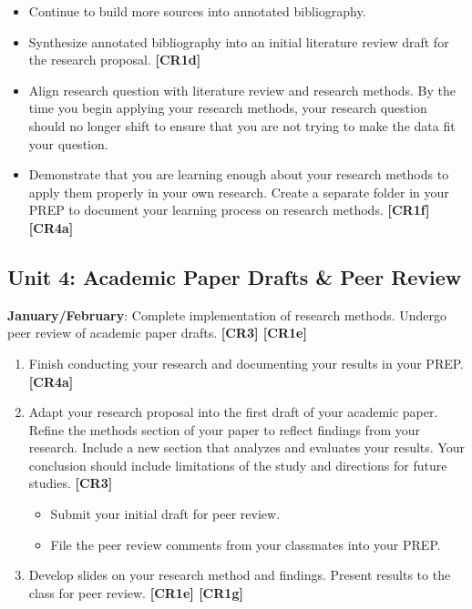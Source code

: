 \documentclass[11pt,]{article}
\providecommand{\tightlist}{%
  \setlength{\itemsep}{0pt}\setlength{\parskip}{0pt}}
\begin{document}
\begin{enumerate}
  \begin{itemize}
  \tightlist
  \item
    Continue to build more sources into annotated bibliography.
  \item
    Synthesize annotated bibliography into an initial literature review draft for the research proposal. \textbf{{[}CR1d{]}} 
  \item
    Align research question with literature review and research methods. By the time you begin applying your research methods, your research question should no longer shift to ensure that you are not trying to make the data fit your question.
  \item
    Demonstrate that you are learning enough about your research methods to apply them properly in your own research. Create a separate folder in your PREP to document your learning process on research methods. \textbf{{[}CR1f{]} {[}CR4a{]}}  
  \end{itemize}
\end{enumerate}

\hypertarget{unit-4-academic-paper-drafts-peer-review}{%
\subsection{Unit 4: Academic Paper Drafts \& Peer Review}\label{unit-4-academic-paper-drafts-peer-review}}

\textbf{January/February}: Complete implementation of research methods. Undergo peer review of academic paper drafts. \textbf{{[}CR3{]} {[}CR1e{]}}  

\begin{enumerate}
\def\labelenumi{\arabic{enumi}.}
\item
  Finish conducting your research and documenting your results in your PREP. \textbf{{[}CR4a{]}} 
\item
  Adapt your research proposal into the first draft of your academic paper. Refine the methods section of your paper to reflect findings from your research. Include a new section that analyzes and evaluates your results. Your conclusion should include limitations of the study and directions for future studies. \textbf{{[}CR3{]}} 

  \begin{itemize}
  \tightlist
  \item
    Submit your initial draft for peer review.
  \item
    File the peer review comments from your classmates into your PREP.
  \end{itemize}
\item
  Develop slides on your research method and findings. Present results to the class for peer review. \textbf{{[}CR1e{]} {[}CR1g{]}}  
\end{enumerate}
\end{document}
